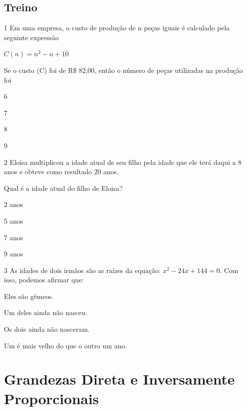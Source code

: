 \section{Treino}

\num{1} Em uma empresa, o custo de produção de n peças
iguais é calculado pela seguinte expressão 

$C(n) = n^2 - n + 10$

Se o custo (C) foi de R\$ 82,00, então o número de peças utilizadas
na produção foi

\begin{escolha}
  \item 6

  \item 7

  \item 8

  \item 9
\end{escolha}


\pagebreak
\num{2} Eloísa multiplicou a idade atual de seu filho pela idade que ele terá
daqui a 8 anos e obteve como resultado 20 anos.

Qual é a idade atual do filho de Eloisa?

\begin{escolha}
  \item 2 anos

  \item 5 anos

  \item 7 anos

  \item 9 anos
\end{escolha}


\num{3} As idades de dois irmãos são as raízes da equação: 
$x^2 - 24x + 144 = 0$. Com isso, podemos afirmar que:

\begin{escolha}
  \item Eles são gêmeos.

  \item Um deles ainda não nasceu.

  \item Os dois ainda não nasceram.

  \item Um é mais velho do que o outro um ano.
\end{escolha}

\chapter{Grandezas Direta e Inversamente Proporcionais}

